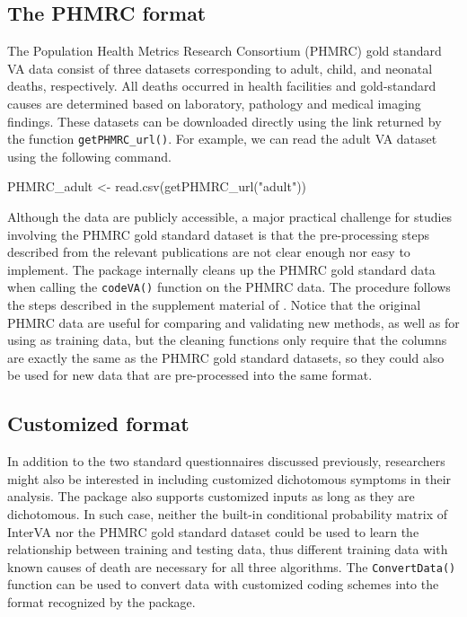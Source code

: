 \hypertarget{the-phmrc-format}{%
\subsection{The PHMRC format}\label{the-phmrc-format}}

The Population Health Metrics Research Consortium (PHMRC) gold standard
VA data \citep{murray2011population} consist of three datasets
corresponding to adult, child, and neonatal deaths, respectively. All
deaths occurred in health facilities and gold-standard causes are
determined based on laboratory, pathology and medical imaging findings.
These datasets can be downloaded directly using the link returned by the
function \texttt{getPHMRC\_url()}. For example, we can read the adult VA
dataset using the following command.

\begin{Schunk}
\begin{Sinput}
PHMRC_adult <- read.csv(getPHMRC_url("adult"))
\end{Sinput}
\end{Schunk}

Although the data are publicly accessible, a major practical challenge
for studies involving the PHMRC gold standard dataset is that the
pre-processing steps described from the relevant publications are not
clear enough nor easy to implement. The  package
internally cleans up the PHMRC gold standard data when calling the
\texttt{codeVA()} function on the PHMRC data. The procedure follows the
steps described in the supplement material of \citet{insilico}. Notice
that the original PHMRC data are useful for comparing and validating new
methods, as well as for using as training data, but the cleaning
functions only require that the columns are exactly the same as the
PHMRC gold standard datasets, so they could also be used for new data
that are pre-processed into the same format.

\hypertarget{customized-format}{%
\subsection{Customized format}\label{customized-format}}

In addition to the two standard questionnaires discussed previously,
researchers might also be interested in including customized dichotomous
symptoms in their analysis. The  package also supports
customized inputs as long as they are dichotomous. In such case, neither
the built-in conditional probability matrix of InterVA nor the PHMRC
gold standard dataset could be used to learn the relationship between
training and testing data, thus different training data with known
causes of death are necessary for all three algorithms. The
\texttt{ConvertData()} function can be used to convert data with
customized coding schemes into the format recognized by the
 package.

